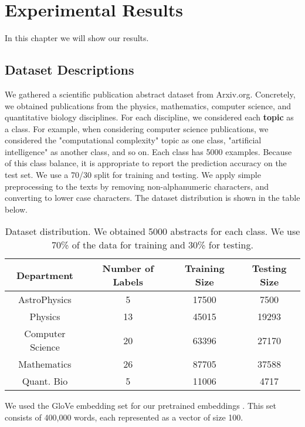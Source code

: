 
\chapter{Experimental Results} \label{Results}
In this chapter we will show our results.

\section{Dataset Descriptions}

We gathered a scientific publication abstract dataset from Arxiv.org. Concretely, we obtained
publications from the physics, mathematics, computer science, and quantitative biology disciplines.
For each discipline, we considered each \textbf{topic} as a
class. For example, when considering computer science publications, we considered the
"computational complexity" topic as one class, "artificial intelligence" as another class,
and so on. Each class has 5000 examples. Because of this class balance, it is appropriate to report the prediction
accuracy on the test set. We use a 70/30 split for training and testing. We apply simple preprocessing to the texts by removing non-alphanumeric
characters, and converting to lower case characters. The dataset distribution is shown in the table below.

\begin{center}
  \begin{table}\begin{tabular}{||c c c c||}
 \hline
 Department & Number of Labels & Training Size & Testing Size\\ [0.5ex]
 \hline\hline
AstroPhysics & 5 & 17500 & 7500\\
Physics & 13 & 45015 & 19293\\
Computer Science & 20 & 63396 & 27170 \\
Mathematics & 26 & 87705 & 37588 \\
Quant. Bio & 5 & 11006 & 4717\\
 [1ex]\hline\end{tabular}\caption{Dataset distribution. We obtained 5000 abstracts for each class. We use 70\% of the data for
 training and 30\% for testing.}\end{table}
\end{center}

We used the GloVe embedding set for our pretrained embeddings \cite{pennington2014glove}. This set consists of 400,000 words, each represented
as a vector of size 100.

